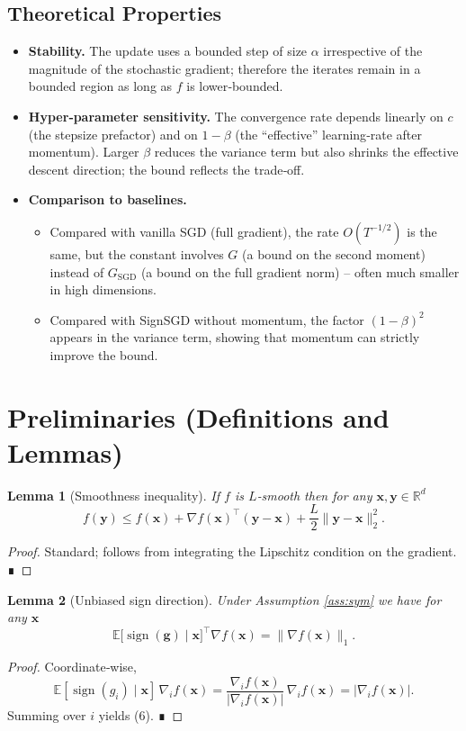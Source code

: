 \documentclass{article}
\newtheorem{lemma}{Lemma}
\newcommand{\sign}{\operatorname{sign}}
\newcommand{\E}{\mathbb{E}}
\newcommand{\R}{\mathbb{R}}
\begin{document}
\subsection*{Theoretical Properties}
\begin{itemize}
\item \textbf{Stability.}  The update uses a bounded step of size $\alpha$ irrespective of the magnitude of the stochastic gradient; therefore the iterates remain in a bounded region as long as $f$ is lower‑bounded.
\item \textbf{Hyper‑parameter sensitivity.}  The convergence rate depends linearly on $c$ (the stepsize prefactor) and on $1-\beta$ (the “effective” learning‑rate after momentum).  Larger $\beta$ reduces the variance term but also shrinks the effective descent direction; the bound reflects the trade‑off.
\item \textbf{Comparison to baselines.}
    \begin{itemize}
    \item Compared with vanilla SGD (full gradient), the rate $O(T^{-1/2})$ is the same, but the constant involves $G$ (a bound on the second moment) instead of $G_{\text{SGD}}$ (a bound on the full gradient norm) – often much smaller in high dimensions.
    \item Compared with SignSGD without momentum, the factor $(1-\beta)^{2}$ appears in the variance term, showing that momentum can strictly improve the bound.
    \end{itemize}
\end{itemize}

\section*{Preliminaries (Definitions and Lemmas)}
\begin{lemma}[Smoothness inequality]\label{lem:smooth}
If $f$ is $L$‑smooth then for any $\bm{x},\bm{y}\in\R^{d}$
\[
f(\bm{y})\le f(\bm{x})+\nabla f(\bm{x})^{\!\top}(\bm{y}-\bm{x})
+\frac{L}{2}\|\bm{y}-\bm{x}\|_{2}^{2}.
\tag{5}
\]
\end{lemma}
\begin{proof}
Standard; follows from integrating the Lipschitz condition on the gradient. ∎
\end{proof}

\begin{lemma}[Unbiased sign direction]\label{lem:sign}
Under Assumption \ref{ass:sym} we have for any $\bm{x}$
\[
\E\!\big[\sign(\bm{g})\mid\bm{x}\big]^{\!\top}\nabla f(\bm{x})
= \|\nabla f(\bm{x})\|_{1}.
\tag{6}
\]
\end{lemma}
\begin{proof}
Coordinate‑wise,
\[
\E[\sign(g_{i})\mid\bm{x}]\,\nabla_{i}f(\bm{x})
= \frac{\nabla_{i}f(\bm{x})}{|\nabla_{i}f(\bm{x})|}\,\nabla_{i}f(\bm{x})
= |\nabla_{i}f(\bm{x})|.
\]
Summing over $i$ yields (6). ∎
\end{proof}
\end{document}
